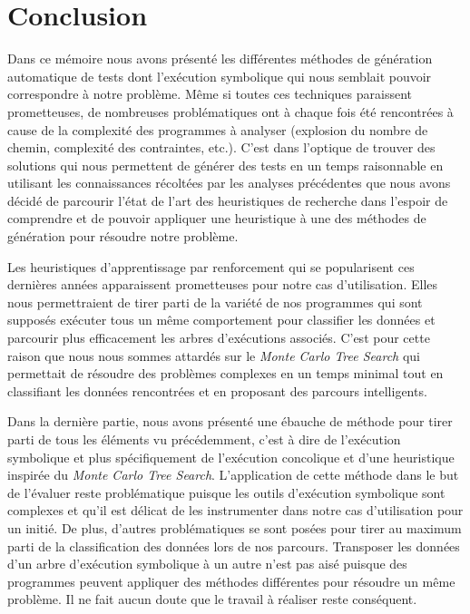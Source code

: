 \chapter*{Conclusion}


Dans ce mémoire nous avons présenté les différentes méthodes de génération automatique de tests dont l'exécution symbolique qui nous semblait pouvoir correspondre à notre problème. Même si toutes ces techniques paraissent prometteuses, de nombreuses problématiques ont à chaque fois été rencontrées à cause de la complexité des programmes à analyser (explosion du nombre de chemin, complexité des contraintes, etc.). C'est dans l'optique de trouver des solutions qui nous permettent de générer des tests en un temps raisonnable en utilisant les connaissances récoltées par les analyses précédentes que nous avons décidé de parcourir l'état de l'art des heuristiques de recherche dans l'espoir de comprendre et de pouvoir appliquer une heuristique à une des méthodes de génération pour résoudre notre problème.

Les heuristiques d'apprentissage par renforcement qui se popularisent ces dernières années apparaissent prometteuses pour notre cas d'utilisation. Elles nous permettraient de tirer parti de la variété de nos programmes qui sont supposés exécuter tous un même comportement pour classifier les données et parcourir plus efficacement les arbres d'exécutions associés. C'est pour cette raison que nous nous sommes attardés sur le \textit{Monte Carlo Tree Search} qui permettait de résoudre des problèmes complexes en un temps minimal tout en classifiant les données rencontrées et en proposant des parcours intelligents.

Dans la dernière partie, nous avons présenté une ébauche de méthode pour tirer parti de tous les éléments vu précédemment, c'est à dire de l'exécution symbolique et plus spécifiquement de l'exécution concolique et d'une heuristique inspirée du \textit{Monte Carlo Tree Search}. L'application de cette méthode dans le but de l'évaluer reste problématique puisque les outils d'exécution symbolique sont complexes et qu'il est délicat de les instrumenter dans notre cas d'utilisation pour un initié. De plus, d'autres problématiques se sont posées pour tirer au maximum parti de la classification des données lors de nos parcours. Transposer les données d'un arbre d'exécution symbolique à un autre n'est pas aisé puisque des programmes peuvent appliquer des méthodes différentes pour résoudre un même problème.
Il ne fait aucun doute que le travail à réaliser reste conséquent.